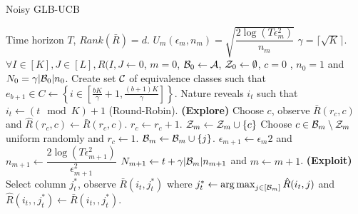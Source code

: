 \begin{algorithm}[!th]
\caption{Noisy GLB-UCB}
\label{alg:NGLB}
\begin{algorithmic}[1]
 Time horizon $T$, $Rank(\bar{R}) = d$.
 $U_m(\epsilon_m, n_m) = \sqrt{\dfrac{2\log(T\epsilon_m^2)}{n_m} }$
 $\gamma = \lceil\sqrt{K} \rceil$.
 $\forall I\in [K], J\in [L], \hat{R}(I,J \leftarrow 0$, $m=0$, $\mathcal{B}_0 \leftarrow \mathcal{A}$, $\mathcal{Z}_0 \leftarrow \emptyset$, $c=0$ , $n_0 = 1 $ and $N_0 = \gamma |\mathcal{B}_0|n_0$.
\State Create set $\mathcal{C}$ of equivalence classes such that 
\State  $e_{b+1}\in C \leftarrow \left\lbrace i\in \left[\frac{bK}{\gamma}+1,\frac{(b+1)K}{\gamma}\right]\right\rbrace$.
\EndFor
{}	
\State Nature reveals $i_t$ such that $i_t \leftarrow (t \mod K) + 1$ (Round-Robin).
 \textbf{ (Explore) }
\State Choose $c$, observe $\bar{R}(r_c,c)$ and $\hat{R}(r_c,c)\leftarrow \bar{R}(r_c,c)$.
\State $r_c \leftarrow r_c + 1$.
\Else
\State $\mathcal{Z}_m \leftarrow \mathcal{Z}_m \cup \lbrace c\rbrace$
\State Choose $c\in\mathcal{B}_m\setminus \mathcal{Z}_m$ uniform randomly and $r_c \leftarrow 1$.
\EndIf
\Else
\ColElim
\State {}
\State {}
\State $\mathcal{B}_m \leftarrow \mathcal{B}_m \cup \lbrace j \rbrace$. 
\EndIf
\EndFor
\EndColElim
\ResParam
\State $\epsilon_{m+1} \leftarrow {\epsilon_m}{2}$ and $n_{m+1} \leftarrow \dfrac{2\log(T\epsilon_{m+1}^2)}{\epsilon_{m+1}^2} $
\State $N_{m+1} \leftarrow t + \gamma |\mathcal{B}_m|n_{m+1}$ and $m \leftarrow m + 1$.
\EndResParam
\EndIf
\Else \textbf{  (Exploit) }
\State  Select column $j_t^*$, observe $\bar{R}(i_t,j_t^*)$ where $j_t^* \leftarrow \mathop{\rm arg\,max}_{j\in[\mathcal{B}_m]} {\hat{R}(i_t,j)}$ and $\hat{R}(i_t,,j_t^*)\leftarrow \bar{R}(i_t,,j_t^*)$.
\EndIf
\EndFor
\end{algorithmic}
\end{algorithm}


